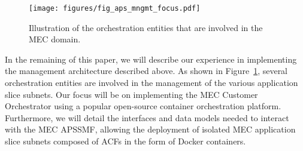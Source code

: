 
%
\begin{figure}[ht]
\centering
\texttt{[image: figures/fig\_aps\_mngmt\_focus.pdf]}
\caption{Illustration of the orchestration entities that are involved in the MEC domain.}
\label{fig:ps_mngmt_focus}
\end{figure}
%
In the remaining of this paper, we will describe our experience in implementing the management architecture described above. As shown in Figure~\ref{fig:ps_mngmt_focus}, several orchestration entities are involved in the management of the various application slice subnets. Our focus will be on implementing the MEC Customer Orchestrator using a popular open-source container orchestration platform. Furthermore, we will detail the interfaces and data models needed to interact with the MEC APSSMF, allowing the deployment of isolated MEC application slice subnets composed of ACFs in the form of Docker containers.  

